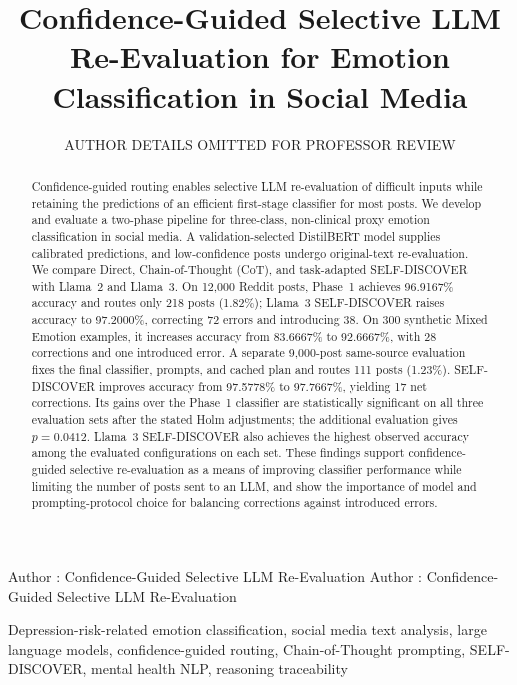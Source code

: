 \documentclass{ieeeaccess}
\begin{document}
\history{}
\doi{}

\title{Confidence-Guided Selective LLM Re-Evaluation for Emotion Classification in Social Media}
\author{\uppercase{Author Details Omitted for Professor Review}}
\address[1]{Affiliation details will be inserted in the submission version.}
\markboth
{Author \headeretal: Confidence-Guided Selective LLM Re-Evaluation}
{Author \headeretal: Confidence-Guided Selective LLM Re-Evaluation}

\begin{abstract}
Confidence-guided routing enables selective LLM re-evaluation of difficult inputs while retaining the predictions of an efficient first-stage classifier for most posts. We develop and evaluate a two-phase pipeline for three-class, non-clinical proxy emotion classification in social media. A validation-selected DistilBERT model supplies calibrated predictions, and low-confidence posts undergo original-text re-evaluation. We compare Direct, Chain-of-Thought (CoT), and task-adapted SELF-DISCOVER with Llama~2 and Llama~3. On 12,000 Reddit posts, Phase~1 achieves 96.9167\% accuracy and routes only 218 posts (1.82\%); Llama~3 SELF-DISCOVER raises accuracy to 97.2000\%, correcting 72 errors and introducing 38. On 300 synthetic Mixed Emotion examples, it increases accuracy from 83.6667\% to 92.6667\%, with 28 corrections and one introduced error. A separate 9,000-post same-source evaluation fixes the final classifier, prompts, and cached plan and routes 111 posts (1.23\%). SELF-DISCOVER improves accuracy from 97.5778\% to 97.7667\%, yielding 17 net corrections. Its gains over the Phase~1 classifier are statistically significant on all three evaluation sets after the stated Holm adjustments; the additional evaluation gives $p=0.0412$. Llama~3 SELF-DISCOVER also achieves the highest observed accuracy among the evaluated configurations on each set. These findings support confidence-guided selective re-evaluation as a means of improving classifier performance while limiting the number of posts sent to an LLM, and show the importance of model and prompting-protocol choice for balancing corrections against introduced errors.

\end{abstract}
\begin{keywords}
Depression-risk-related emotion classification, social media text analysis, large language models, confidence-guided routing, Chain-of-Thought prompting, SELF-DISCOVER, mental health NLP, reasoning traceability
\end{keywords}
\end{document}
